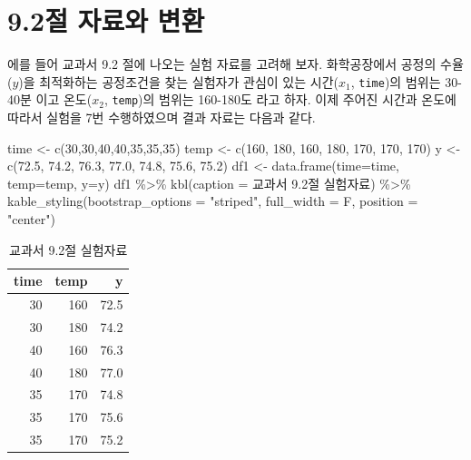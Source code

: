 \documentclass[
]{book}
\newenvironment{Shaded}{\begin{snugshade}}{\end{snugshade}}
\newcommand{\AttributeTok}[1]{\textcolor[rgb]{0.77,0.63,0.00}{#1}}
\newcommand{\DecValTok}[1]{\textcolor[rgb]{0.00,0.00,0.81}{#1}}
\newcommand{\FloatTok}[1]{\textcolor[rgb]{0.00,0.00,0.81}{#1}}
\newcommand{\FunctionTok}[1]{\textcolor[rgb]{0.00,0.00,0.00}{#1}}
\newcommand{\NormalTok}[1]{#1}
\newcommand{\OtherTok}[1]{\textcolor[rgb]{0.56,0.35,0.01}{#1}}
\newcommand{\SpecialCharTok}[1]{\textcolor[rgb]{0.00,0.00,0.00}{#1}}
\newcommand{\StringTok}[1]{\textcolor[rgb]{0.31,0.60,0.02}{#1}}
\theoremstyle{definition}
\theoremstyle{definition}
\theoremstyle{definition}
\theoremstyle{definition}
\theoremstyle{remark}
\begin{document}
\hypertarget{uxc808-uxc790uxb8ccuxc640-uxbcc0uxd658}{%
\section{9.2절 자료와 변환}\label{uxc808-uxc790uxb8ccuxc640-uxbcc0uxd658}}

에를 들어 교과서 9.2 절에 나오는 실험 자료를 고려해 보자. 화학공장에서 공정의 수율(\(y\))을 최적화하는 공정조건을 찾는 실험자가 관심이 있는 시간(\(x_1\), \texttt{time})의 범위는 30-40분 이고 온도(\(x_2\), \texttt{temp})의 범위는 160-180도 라고 하자.
이제 주어진 시간과 온도에 따라서 실험을 7번 수행하였으며 결과 자료는 다음과 같다.

\begin{Shaded}
\begin{Highlighting}[]
\NormalTok{time }\OtherTok{\textless{}{-}} \FunctionTok{c}\NormalTok{(}\DecValTok{30}\NormalTok{,}\DecValTok{30}\NormalTok{,}\DecValTok{40}\NormalTok{,}\DecValTok{40}\NormalTok{,}\DecValTok{35}\NormalTok{,}\DecValTok{35}\NormalTok{,}\DecValTok{35}\NormalTok{)}
\NormalTok{temp }\OtherTok{\textless{}{-}} \FunctionTok{c}\NormalTok{(}\DecValTok{160}\NormalTok{, }\DecValTok{180}\NormalTok{, }\DecValTok{160}\NormalTok{, }\DecValTok{180}\NormalTok{, }\DecValTok{170}\NormalTok{, }\DecValTok{170}\NormalTok{, }\DecValTok{170}\NormalTok{)}
\NormalTok{y }\OtherTok{\textless{}{-}} \FunctionTok{c}\NormalTok{(}\FloatTok{72.5}\NormalTok{, }\FloatTok{74.2}\NormalTok{, }\FloatTok{76.3}\NormalTok{, }\FloatTok{77.0}\NormalTok{, }\FloatTok{74.8}\NormalTok{, }\FloatTok{75.6}\NormalTok{, }\FloatTok{75.2}\NormalTok{)}
\NormalTok{df1 }\OtherTok{\textless{}{-}} \FunctionTok{data.frame}\NormalTok{(}\AttributeTok{time=}\NormalTok{time, }\AttributeTok{temp=}\NormalTok{temp, }\AttributeTok{y=}\NormalTok{y)}
\NormalTok{df1 }\SpecialCharTok{\%\textgreater{}\%}  \FunctionTok{kbl}\NormalTok{(}\AttributeTok{caption =} \StringTok{\textquotesingle{}교과서 9.2절 실험자료\textquotesingle{}}\NormalTok{) }\SpecialCharTok{\%\textgreater{}\%} \FunctionTok{kable\_styling}\NormalTok{(}\AttributeTok{bootstrap\_options =} \StringTok{"striped"}\NormalTok{, }\AttributeTok{full\_width =}\NormalTok{ F, }\AttributeTok{position =} \StringTok{"center"}\NormalTok{)}
\end{Highlighting}
\end{Shaded}

\begin{table}

\caption{\label{tab:unnamed-chunk-2}교과서 9.2절 실험자료}
\centering
\begin{tabular}[t]{r|r|r}
\hline
time & temp & y\\
\hline
30 & 160 & 72.5\\
\hline
30 & 180 & 74.2\\
\hline
40 & 160 & 76.3\\
\hline
40 & 180 & 77.0\\
\hline
35 & 170 & 74.8\\
\hline
35 & 170 & 75.6\\
\hline
35 & 170 & 75.2\\
\hline
\end{tabular}
\end{table}
\end{document}
